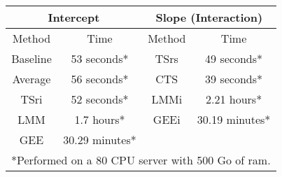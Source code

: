 \begin{table}[ht]
\centering
\caption{} 
\label{tab:timemodels}
{\small
\begin{tabular}{cccc}
   \multicolumn{2}{c}{Intercept} & \multicolumn{2}{c}{Slope (Interaction)}\\
\hline
Method & Time & Method & Time \\ 
   \hline
Baseline & 53 seconds* & TSrs & 49 seconds* \\ 
  Average & 56 seconds* & CTS & 39 seconds* \\ 
  TSri & 52 seconds* & LMMi & 2.21 hours*   \\ 
  LMM & 1.7 hours*   & GEEi & 30.19 minutes* \\ 
  GEE & 30.29 minutes* &  &  \\ 
   \hline
\multicolumn{4}{l}{\footnotesize{*Performed on a 80 CPU server with 500 Go of ram.}}
\end{tabular}
}
\end{table}
